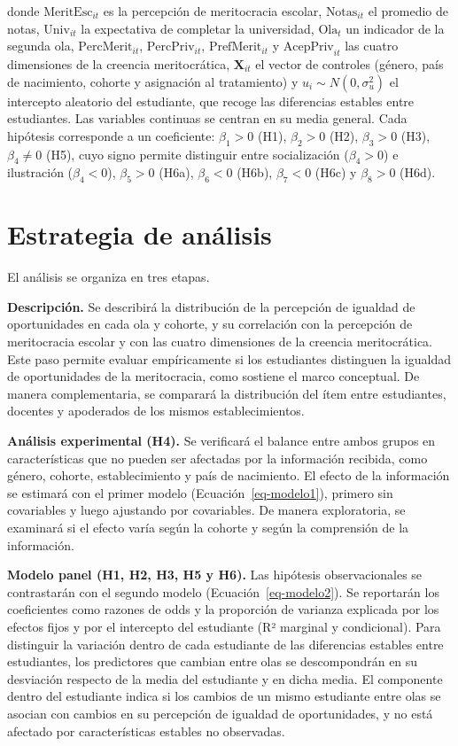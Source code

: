 \documentclass[
  spanish,
  a4paper,
  oneside]{scrbook}
\begin{document}
donde \(\text{MeritEsc}_{it}\) es la percepción de meritocracia escolar,
\(\text{Notas}_{it}\) el promedio de notas, \(\text{Univ}_{it}\) la
expectativa de completar la universidad, \(\text{Ola}_t\) un indicador
de la segunda ola, \(\text{PercMerit}_{it}\), \(\text{PercPriv}_{it}\),
\(\text{PrefMerit}_{it}\) y \(\text{AcepPriv}_{it}\) las cuatro
dimensiones de la creencia meritocrática, \(\mathbf{X}_{it}\) el vector
de controles (género, país de nacimiento, cohorte y asignación al
tratamiento) y \(u_i \sim N(0, \sigma_u^2)\) el intercepto aleatorio del
estudiante, que recoge las diferencias estables entre estudiantes. Las
variables continuas se centran en su media general. Cada hipótesis
corresponde a un coeficiente: \(\beta_1 > 0\) (H1), \(\beta_2 > 0\)
(H2), \(\beta_3 > 0\) (H3), \(\beta_4 \neq 0\) (H5), cuyo signo permite
distinguir entre socialización (\(\beta_4 > 0\)) e ilustración
(\(\beta_4 < 0\)), \(\beta_5 > 0\) (H6a), \(\beta_6 < 0\) (H6b),
\(\beta_7 < 0\) (H6c) y \(\beta_8 > 0\) (H6d).

\section{Estrategia de análisis}\label{estrategia-de-anuxe1lisis}

El análisis se organiza en tres etapas.

\textbf{Descripción.} Se describirá la distribución de la percepción de
igualdad de oportunidades en cada ola y cohorte, y su correlación con la
percepción de meritocracia escolar y con las cuatro dimensiones de la
creencia meritocrática. Este paso permite evaluar empíricamente si los
estudiantes distinguen la igualdad de oportunidades de la meritocracia,
como sostiene el marco conceptual. De manera complementaria, se
comparará la distribución del ítem entre estudiantes, docentes y
apoderados de los mismos establecimientos.

\textbf{Análisis experimental (H4).} Se verificará el balance entre
ambos grupos en características que no pueden ser afectadas por la
información recibida, como género, cohorte, establecimiento y país de
nacimiento. El efecto de la información se estimará con el primer modelo
(Ecuación~\ref{eq-modelo1}), primero sin covariables y luego ajustando
por covariables. De manera exploratoria, se examinará si el efecto varía
según la cohorte y según la comprensión de la información.

\textbf{Modelo panel (H1, H2, H3, H5 y H6).} Las hipótesis
observacionales se contrastarán con el segundo modelo
(Ecuación~\ref{eq-modelo2}). Se reportarán los coeficientes como razones
de odds y la proporción de varianza explicada por los efectos fijos y
por el intercepto del estudiante (R² marginal y condicional). Para
distinguir la variación dentro de cada estudiante de las diferencias
estables entre estudiantes, los predictores que cambian entre olas se
descompondrán en su desviación respecto de la media del estudiante y en
dicha media. El componente dentro del estudiante indica si los cambios
de un mismo estudiante entre olas se asocian con cambios en su
percepción de igualdad de oportunidades, y no está afectado por
características estables no observadas.
\end{document}
